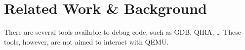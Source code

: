 


\section{Related Work \& Background}



There are several tools available to debug code, such as GDB\cite{4682115}, QIRA\cite{206279}, \dots
%
These tools, however, are not aimed to interact with QEMU.
%


